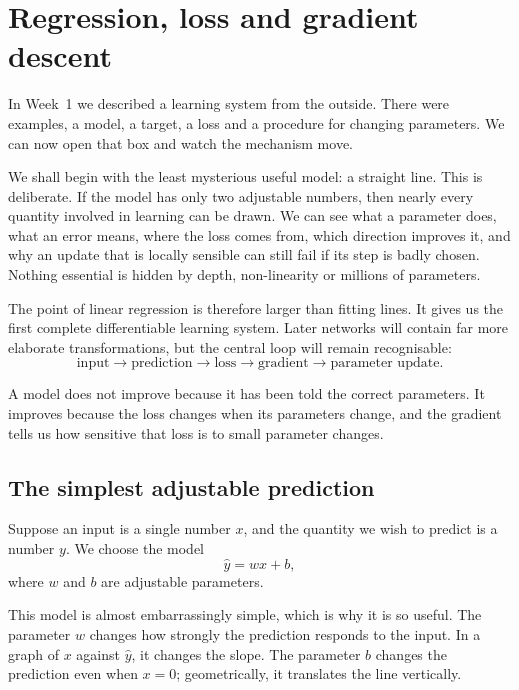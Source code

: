 \chapter{Regression, loss and gradient descent}
\label{chap:week02}

In Week~1 we described a learning system from the outside. There were examples, a model, a target, a loss and a procedure for changing parameters. We can now open that box and watch the mechanism move.

We shall begin with the least mysterious useful model: a straight line. This is deliberate. If the model has only two adjustable numbers, then nearly every quantity involved in learning can be drawn. We can see what a parameter does, what an error means, where the loss comes from, which direction improves it, and why an update that is locally sensible can still fail if its step is badly chosen. Nothing essential is hidden by depth, non-linearity or millions of parameters.

The point of linear regression is therefore larger than fitting lines. It gives us the first complete differentiable learning system. Later networks will contain far more elaborate transformations, but the central loop will remain recognisable:
\[
\text{input} \longrightarrow \text{prediction} \longrightarrow \text{loss}
\longrightarrow \text{gradient} \longrightarrow \text{parameter update}.
\]

\begin{keyidea}
A model does not improve because it has been told the correct parameters. It improves because the loss changes when its parameters change, and the gradient tells us how sensitive that loss is to small parameter changes.
\end{keyidea}

\section{The simplest adjustable prediction}

Suppose an input is a single number \(x\), and the quantity we wish to predict is a number \(y\). We choose the model
\begin{equation}
  \hat y = wx+b,
  \label{eq:week2-line}
\end{equation}
where \(w\) and \(b\) are adjustable parameters.

This model is almost embarrassingly simple, which is why it is so useful. The parameter \(w\) changes how strongly the prediction responds to the input. In a graph of \(x\) against \(\hat y\), it changes the slope. The parameter \(b\) changes the prediction even when \(x=0\); geometrically, it translates the line vertically.

